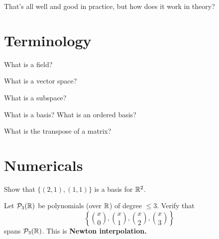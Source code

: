 \documentclass{homework}
\author{Jim Fowler}
\begin{document}
\maketitle

\begin{inspiration}
That's all well and good in practice, but how does it work in theory?
\end{inspiration}

\section{Terminology}

\begin{problem}
  What is a field?
\end{problem}

\begin{problem}
  What is a vector space?
\end{problem}

\begin{problem}
  What is a subspace?
\end{problem}

\begin{problem}
  What is a basis?  What is an ordered basis?
\end{problem}

\begin{problem} %
  What is the transpose of a matrix?
\end{problem}

\section{Numericals}


\begin{problem}
  Show that $\{ (2,1), (1,1) \}$ is a basis for $\mathbb{R}^2$.
\end{problem}

\begin{problem}
  Let $\mathcal{P}_{3}(\mathbb{R})$ be polynomials (over $\mathbb{R}$) of degree $\leq 3$.  Verify that
  \[ \left\{ \binom{x}{0}, \binom{x}{1}, \binom{x}{2}, \binom{x}{3} \right\} \]
  spans $\mathcal{P}_{3}(\mathbb{R})$.  This is \textbf{Newton interpolation.}
\end{problem}
\end{document}
